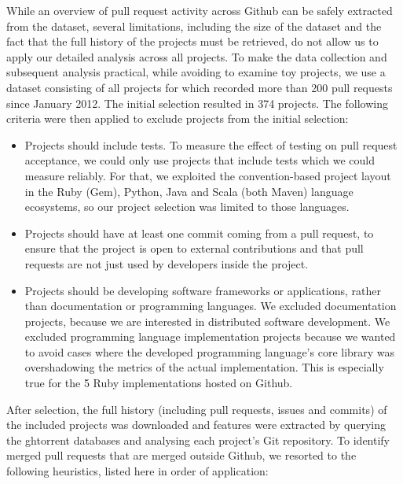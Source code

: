 \documentclass{sig-alternate}
\begin{document}
While an overview of pull request activity across Github can be safely extracted
from the \ghtorrent dataset, several limitations, including the size of the
dataset and the fact that the full history of the projects must be retrieved, do
not allow us to apply our detailed analysis across all projects. To make the
data collection and subsequent analysis practical, while avoiding to examine toy
projects, we use a dataset consisting of all projects for which \ghtorrent
recorded more than 200 pull requests since January 2012. The initial selection
resulted in 374 projects. The following criteria were then applied to exclude
projects from the initial selection:

\begin{itemize}

  \item Projects should include tests. To measure the effect of testing on pull
    request acceptance, we could only use projects that include tests which we
    could measure reliably. For that, we exploited the convention-based project
    layout in the Ruby (Gem), Python, Java and Scala (both Maven) language
    ecosystems, so our project selection was limited to those languages. 

  \item Projects should have at least one commit coming from a pull request, to
    ensure that the project is open to external contributions and that pull
    requests are not just used by developers inside the project.

  \item Projects should be developing software frameworks or applications,
    rather than documentation or programming languages. We excluded
    documentation projects, because we are interested in distributed software
    development. We excluded programming language implementation projects
    because we wanted to avoid cases where the developed programming language's
    core library was overshadowing the metrics of the actual implementation.
    This is especially true for the 5 Ruby implementations hosted on Github.

\end{itemize}

After selection, the full history (including pull requests, issues and commits)
of the included projects was downloaded and features were extracted by querying
the {\sc ght}orrent databases and analysing each project's Git repository. To
identify merged pull requests that are merged outside Github, we resorted to the following heuristics, listed here in order of application:
\end{document}
